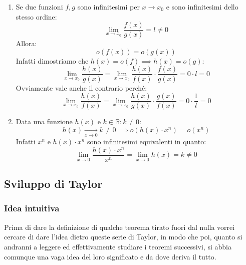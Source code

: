 \begin{enumerate}
	\item Se due funzioni $f,g$ sono infinitesimi per $x \to x_0$ e sono infinitesimi dello stesso ordine:
		\begin{equation*}
			\lim_{x \to x_0} \dfrac{f(x)}{g(x)} = l \neq 0
		\end{equation*}
		Allora:
		\begin{equation*}
			o(f(x)) = o(g(x))
		\end{equation*}
		Infatti dimostriamo che $h(x) = o(f) \implies h(x) = o(g)$:
		\begin{equation*}
			\lim_{x \to x_0} \dfrac{h(x)}{g(x)} = \lim_{x \to x_0} \dfrac{h(x)}{f(x)} \cdot \dfrac{f(x)}{g(x)} = 0 \cdot l = 0
		\end{equation*}
		Ovviamente vale anche il contrario perché:
		\begin{equation*}
			\lim_{x \to x_0} \dfrac{h(x)}{f(x)} = \lim_{x \to x_0} \dfrac{h(x)}{g(x)} \cdot \dfrac{g(x)}{f(x)} = 0 \cdot \dfrac{1}{l} = 0
		\end{equation*}

	\item Data una funzione $h(x)$ e $k \in \mathbb{R} : k \neq 0$:
		\begin{equation*}
			h(x) \xrightarrow[x \to 0]{} k \neq 0 \implies o(h(x) \cdot x^n) = o(x^n)
		\end{equation*}
		Infatti $x^n$ e $h(x) \cdot x^n$ sono infinitesimi equivalenti in quanto:
		\begin{equation*}
			\lim_{x \to 0} \dfrac{h(x) \cdot x^n}{x^n} = \lim_{x \to 0} h(x) = k \neq 0
		\end{equation*}
\end{enumerate}





\subsection{Sviluppo di Taylor}

\subsubsection{Idea intuitiva}
Prima di dare la definizione di qualche teorema tirato fuori dal nulla vorrei cercare di dare l'idea dietro queste serie di Taylor, in modo che poi, quanto si andranni a leggere ed effettivamente studiare i teoremi successivi, si abbia comunque una vaga idea del loro significato e da dove deriva il tutto.\\

